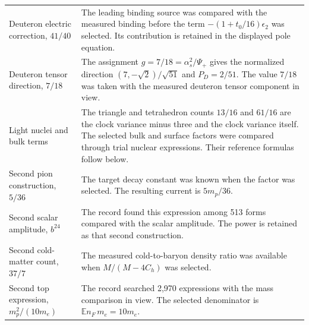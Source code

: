 \documentclass[aps,prx,onecolumn,10pt,notitlepage,nofootinbib,longbibliography]{revtex4-2}
\numberwithin{equation}{section}
\numberwithin{table}{section}
\newcommand{\EE}{\mathbb E}
\begin{document}
\begin{longtable}{@{}>{\raggedright\arraybackslash}p{}>{\raggedright\arraybackslash}p{}@{}}
Deuteron electric correction, $41/40$&The leading binding source was compared with the measured binding before the term $-(1+t_0/16)\epsilon_2$ was selected. Its contribution is retained in the displayed pole equation.\\[5pt]
Deuteron tensor direction, $7/18$&The assignment $g=7/18=\alpha_s^2/\Psi_+$ gives the normalized direction $(7,-\sqrt2)/\sqrt{51}$ and $P_D=2/51$. The value $7/18$ was taken with the measured deuteron tensor component in view.\\[5pt]
Light nuclei and bulk terms&The triangle and tetrahedron counts $13/16$ and $61/16$ are the clock variance minus three and the clock variance itself. The selected bulk and surface factors were compared through trial nuclear expressions. Their reference formulas follow below.\\[5pt]
Second pion construction, $5/36$&The target decay constant was known when the factor was selected. The resulting current is $5m_p/36$.\\[5pt]
Second scalar amplitude, $b^{24}$&The record found this expression among 513 forms compared with the scalar amplitude. The power is retained as that second construction.\\[5pt]
Second cold-matter count, $37/7$&The measured cold-to-baryon density ratio was available when $M/(M-4C_h)$ was selected.\\[5pt]
Second top expression, $m_p^2/(10m_e)$&The record searched 2,970 expressions with the mass comparison in view. The selected denominator is $\EE n_F\,m_e=10m_e$.\\
\end{longtable}\endgroup
\end{document}
